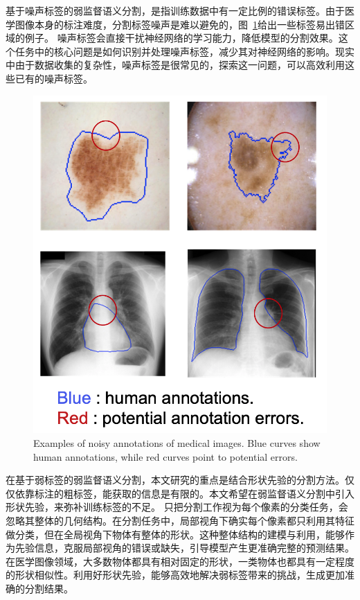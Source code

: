 基于噪声标签的弱监督语义分割，是指训练数据中有一定比例的错误标签。由于医学图像本身的标注难度，分割标签噪声是难以避免的，图~\ref{c1_fig3}给出一些标签易出错区域的例子。
噪声标签会直接干扰神经网络的学习能力，降低模型的分割效果。这个任务中的核心问题是如何识别并处理噪声标签，减少其对神经网络的影响。现实中由于数据收集的复杂性，噪声标签是很常见的，探索这一问题，可以高效利用这些已有的噪声标签。
    \begin{figure}[tbp]
        \centering 
        \includegraphics[width=1.0\textwidth]{img/c1/intro_3.png}
        {Examples of noisy annotations of medical images. Blue curves show human annotations, while red curves point to potential errors.}
        \label{c1_fig3}
    \end{figure}

在基于弱标签的弱监督语义分割，本文研究的重点是结合形状先验的分割方法。仅仅依靠标注的粗标签，能获取的信息是有限的。本文希望在弱监督语义分割中引入形状先验，来弥补训练标签的不足。
只把分割工作视为每个像素的分类任务，会忽略其整体的几何结构。在分割任务中，局部视角下确实每个像素都只利用其特征做分类，但在全局视角下物体有整体的形状。这种整体结构的建模与利用，能够作为先验信息，克服局部视角的错误或缺失，引导模型产生更准确完整的预测结果。
在医学图像领域，大多数物体都具有相对固定的形状，一类物体也都具有一定程度的形状相似性。利用好形状先验，能够高效地解决弱标签带来的挑战，生成更加准确的分割结果。


